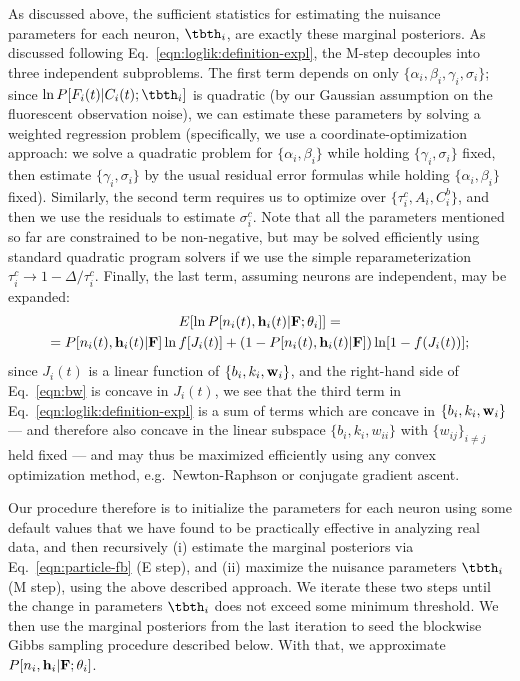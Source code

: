 As discussed above, the sufficient statistics for estimating the nuisance parameters for each neuron, $\tbth_i$, are exactly these marginal posteriors. As discussed following Eq.~\eqref{eqn:loglik:definition-expl}, the M-step decouples into three independent subproblems. The first term depends on only $\{\alpha_i, \beta_i, \gamma_i, \sigma_i\}$; since $\ln P[F_i(t)|C_i(t); \tbth_i]$ is quadratic (by our Gaussian assumption on the fluorescent observation noise), we can estimate these parameters by solving a weighted regression problem (specifically, we use a coordinate-optimization approach: we solve a quadratic problem for $\{\alpha_i, \beta_i\}$ while holding $\{\gamma_i, \sigma_i\}$ fixed, then estimate $\{\gamma_i,\sigma_i\}$ by the usual residual error formulas while holding $\{\alpha_i, \beta_i\}$ fixed). Similarly, the second term requires us to optimize over $\{\tau_i^c, A_i, C_i^b\}$, and then we use the residuals to estimate $\sigma_i^c$. Note that all the parameters mentioned so far are constrained to be non-negative, but may be solved efficiently using standard quadratic program solvers if we use the simple reparameterization $\tau_i^c \to 1- \Delta / \tau_i^c$. Finally, the last term, assuming neurons are independent, may be expanded:
\begin{multline}
E [\ln P[n_i(t), \bh_i(t) | \bF; \bth_i]] =  \\ = P[n_i(t), \bh_i(t) |
\bF] \ln f [J_i(t)] + (1-P[n_i(t), \bh_i(t) | \bF]) \ln [1-
f(J_i(t))];
\label{eqn:bw}
\end{multline}
since $J_i(t)$ is a linear function of $\{b_i,k_i,\mathbf{w}_i\}$, and the right-hand side of Eq.~\eqref{eqn:bw} is concave in $J_i(t)$, we see that the third term in Eq.~\eqref{eqn:loglik:definition-expl} is a sum of terms which are concave in $\{b_i,k_i,\mathbf{w}_i\}$ --- and therefore also concave in the linear subspace $\{b_i,k_i, w_{ii}\}$ with $\{w_{ij}\}_{i \neq j}$ held fixed --- and may thus be maximized efficiently using any convex optimization method, e.g.\ Newton-Raphson or conjugate gradient ascent.

Our procedure therefore is to initialize the parameters for each neuron using some default values that we have found to be practically effective in analyzing real data, and then recursively (i) estimate the marginal posteriors via Eq.~\eqref{eqn:particle-fb} (E step), and (ii) maximize the nuisance parameters $\tbth_i$ (M step), using the above described approach. We iterate these two steps until the change in parameters $\tbth_i$ does not exceed some minimum threshold. We then use the marginal posteriors from the last iteration to seed the blockwise Gibbs sampling procedure described below. With that, we approximate $P[n_i,\mathbf{h}_i | {\bf F};\mathbf{\theta}_i]$.

